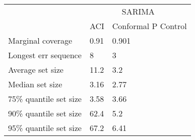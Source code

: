 \begin{tabular}{lll}
\toprule
& \multicolumn{2}{c}{SARIMA} \\
& ACI & Conformal P Control \\
\midrule
Marginal coverage & 0.91 & 0.901 \\
Longest err sequence & 8 & 3 \\
Average set size & 11.2 & 3.2 \\
Median set size & 3.16 & 2.77 \\
75\% quantile set size & 3.58 & 3.66 \\
90\% quantile set size & 62.4 & 5.2 \\
95\% quantile set size & 67.2 & 6.41 \\
\bottomrule
\end{tabular}
